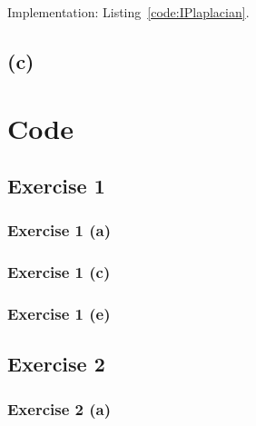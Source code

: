 \documentclass{article}
\begin{document}
 Implementation: Listing~\ref{code:IPlaplacian}.

\subsection*{(c)}




\appendix
\section{Code}
\subsection{Exercise 1}


\subsubsection{Exercise 1 (a)}

\subsubsection{Exercise 1 (c)}

\subsubsection{Exercise 1 (e)}

\subsection{Exercise 2}
\subsubsection{Exercise 2 (a)}

\end{document}
